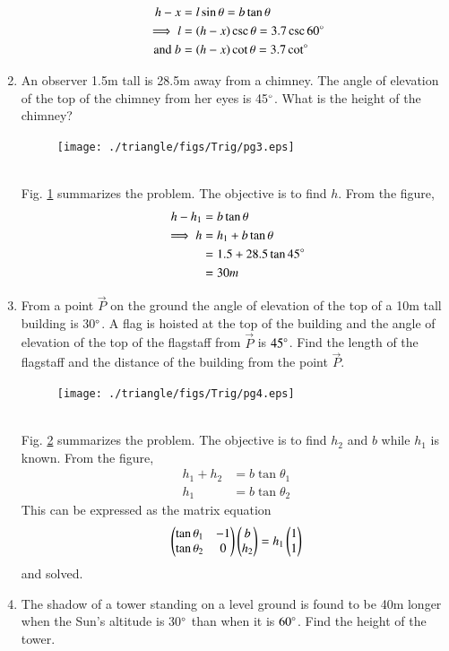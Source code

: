 \begin{enumerate}[label=\arabic*.,ref=\thesubsection.\theenumi]
\begin{align}
h-x &= l\sin \theta = b\tan \theta
\\
\implies l &= \left(h-x\right)\csc \theta = 3.7\csc60\degree 
\\
\text{and } b&=\left(h-x\right)\cot\theta = 3.7 \cot \degree 
\end{align}
\item An observer 1.5m tall is 28.5m away from a chimney.  The angle of elevation of the top of the chimney from her eyes is 45$\degree$.  What is the height of the chimney?
%
%
\begin{figure}[!ht]
\texttt{[image: ./triangle/figs/Trig/pg3.eps]}
\caption{}
\label{fig:trig_pg3}
\end{figure}
%
\\
\solution Fig. \ref{fig:trig_pg3} summarizes the problem. The objective is to find $h$.  From the figure,
%
\begin{align}
h-h_1 &=  b\tan \theta
\\
\implies h &= h_1+b\tan\theta 
\\
&= 1.5+28.5\tan45\degree 
\\
&= 30m
\end{align}
\item From a point $\vec{P}$ on the ground the angle of elevation of the top of a 10m tall building is 30$\degree$.  A flag is hoisted at the top of the building and the angle of elevation of the top of the flagstaff from $\vec{P}$ is $45\degree$.  Find the length of the flagstaff and the distance of the building from the point $\vec{P}$.
%
\begin{figure}[!ht]
\texttt{[image: ./triangle/figs/Trig/pg4.eps]}
\caption{}
\label{fig:trig_pg4}
\end{figure}
%
\\
\solution Fig. \ref{fig:trig_pg4} summarizes the problem. The objective is to find $h_2$ and $b$ while $h_1$ is known.  From the figure, 
%
\begin{align}
h_1+h_2 &=  b\tan \theta_1
\\
h_1 &= b\tan \theta_2
\end{align}
%
This can be expressed as the matrix equation 
%
\begin{align}
\begin{pmatrix}
\tan \theta_1 & -1
\\
\tan \theta_2 &0
\end{pmatrix}\begin{pmatrix}b\\h_2\end{pmatrix}
= h_1\begin{pmatrix}1\\1\end{pmatrix}
\end{align}
%
and solved.
\item The shadow of a tower standing on a level ground is found to be 40m longer when the Sun's altitude is 30$\degree$ than when it is $60\degree$.  Find the height of the tower.

\end{enumerate}
